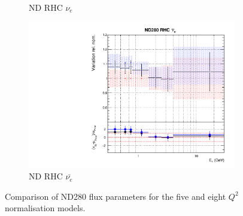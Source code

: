 \begin{figure}
\begin{subfigure}{0.45\textwidth}
  \caption{ND RHC $\nu_{e}$}
\end{subfigure}
\begin{subfigure}{0.45\textwidth}
  \centering
  \includegraphics[width=0.75\linewidth]{figs/comp5q2vs8q2flux7}
  \caption{ND RHC $\bar{\nu_e}$}
\end{subfigure}
\caption{Comparison of ND280 flux parameters for the five and eight $Q^2$ normalisation models.}
\label{fig:comp5q2vs8q2fluxND}
\end{figure}

